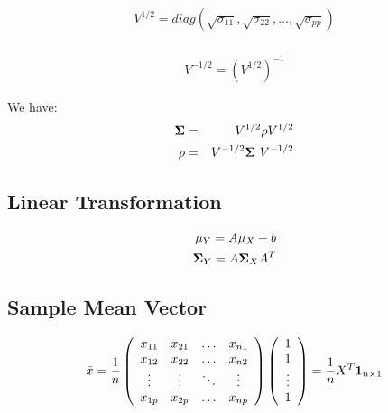 \documentclass[12pt]{extarticle}
\newcommand{\<}{\langle}
\renewcommand{\>}{\rangle}
\theoremstyle{definition}
\begin{document}
\begin{eqnarray*}
V^{1/2} = diag(\sqrt{\sigma_{11}}, \sqrt{\sigma_{22}}, ..., \sqrt{\sigma_{pp}})\\
\end{eqnarray*}

\begin{eqnarray*}
V^{-1/2} = (V^{1/2})^{-1}
\end{eqnarray*}

We have: 
\begin{eqnarray*}
{\bf \Sigma} &=& V^{1/2}\rho V^{1/2}\\
\rho &=& V^{-1/2} {\bf \Sigma} \  V^{-1/2}
\end{eqnarray*}

\subsection{Linear Transformation}
\begin{eqnarray*}
\mu_Y = A\mu_X + b \\
{\bf \Sigma}_Y = A {\bf \Sigma}_X A^T
\end{eqnarray*}

\subsection{Sample Mean Vector}
\begin{eqnarray*}
\Bar{x} = \frac{1}{n}
    \left(\begin{array}{cccc}
      x_{11} & x_{21} & \ldots & x_{n1} \\
      x_{12} & x_{22} & \ldots & x_{n2} \\
      \vdots & \vdots & \ddots & \vdots \\
      x_{1p} & x_{2p} & \ldots & x_{np}
    \end{array} \right)
    \left(\begin{array}{c}
      1 \\ 1 \\ \vdots \\ 1
    \end{array} \right)
=\frac{1}{n} X^T {\bf 1}_{n \times 1}
\end{eqnarray*}
\end{document}
